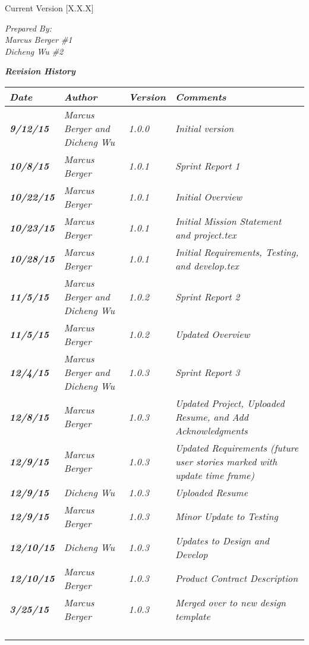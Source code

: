 


Current Version [X.X.X]
\vspace*{5mm}

{\color{SDColor5}
\noindent
\textit{Prepared By:}\\
\textit{Marcus Berger \#1}\\
\textit{Dicheng Wu \#2}\\
}

\vfill
\noindent
{\color{SDColor3} \textit{\textbf{Revision History}}}\\
\begin{tabular}{|>{\raggedright}p{1.5cm}|>{\raggedright}p{3cm}|>{\raggedright}p{1.5cm}|>{\raggedright}p{9cm}|}
\hline
\textit{\textbf{Date}} &  \textit{\textbf{Author}} & \textit{\textbf{Version}} & \textit{\textbf{Comments}}\tabularnewline
\hline
 \textit{\textbf{9/12/15}} & \textit{Marcus Berger and Dicheng Wu} & \textit{1.0.0} & \textit{Initial version}\tabularnewline
\hline
\textit{\textbf{10/8/15}} & \textit{Marcus Berger} & \textit{1.0.1} & \textit{Sprint Report 1}\tabularnewline
\hline
\textit{\textbf{10/22/15}} & \textit{Marcus Berger} & \textit{1.0.1} & \textit{Initial Overview}\tabularnewline
\hline
\textit{\textbf{10/23/15}} & \textit{Marcus Berger} & \textit{1.0.1} & \textit{Initial Mission Statement and project.tex}\tabularnewline
\hline
\textit{\textbf{10/28/15}} & \textit{Marcus Berger} & \textit{1.0.1} & \textit{Initial Requirements, Testing, and develop.tex }\tabularnewline
\hline
\textit{\textbf{11/5/15}} & \textit{Marcus Berger and Dicheng Wu} & \textit{1.0.2} & \textit{Sprint Report 2}\tabularnewline
\hline
\textit{\textbf{11/5/15}} & \textit{Marcus Berger} & \textit{1.0.2} & \textit{Updated Overview}\tabularnewline
\hline
\textit{\textbf{12/4/15}} & \textit{Marcus Berger and Dicheng Wu} & \textit{1.0.3} & \textit{Sprint Report 3}\tabularnewline
\hline
\textit{\textbf{12/8/15}} & \textit{Marcus Berger} & \textit{1.0.3} & \textit{Updated Project, Uploaded Resume, and Add Acknowledgments}\tabularnewline
\hline
\textit{\textbf{12/9/15}} & \textit{Marcus Berger} & \textit{1.0.3} & \textit{Updated Requirements (future user stories marked with update time frame) }\tabularnewline
\hline
\textit{\textbf{12/9/15}} & \textit{Dicheng Wu} & \textit{1.0.3} & \textit{Uploaded Resume}\tabularnewline
\hline
\textit{\textbf{12/9/15}} & \textit{Marcus Berger} & \textit{1.0.3} & \textit{Minor Update to Testing}\tabularnewline
\hline
\textit{\textbf{12/10/15}} & \textit{Dicheng Wu} & \textit{1.0.3} & \textit{Updates to Design and Develop}\tabularnewline
\hline
\textit{\textbf{12/10/15}} & \textit{Marcus Berger} & \textit{1.0.3} & \textit{Product Contract Description}\tabularnewline
\hline
\textit{\textbf{3/25/15}} & \textit{Marcus Berger} & \textit{1.0.3} & \textit{Merged over to new design template}\tabularnewline
\hline
 &  &  & \tabularnewline
\hline
 &  &  & \tabularnewline
\hline
 &  &  & \tabularnewline
\hline
 &  &  & \tabularnewline
\hline
\end{tabular}
\vfill

